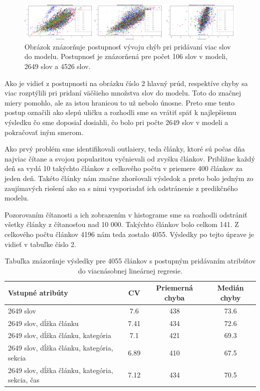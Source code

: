 \documentclass[runningheads,a4paper]{llncs}
\begin{document}
\begin{figure}[h!]
  \centering  
      \includegraphics[width=1.0\textwidth]{proc.png}
  \caption{Obrázok znázorňuje postupnosť vývoju chýb pri pridávaní viac slov do modelu. Postupnosť je znázorňená pre počet 106 slov v modeli, 2649 slov a 4526 slov. }  
\end{figure}   	

Ako je vidieť z postupnosti na obrázku číslo 2 hlavný prúd, respektíve chyby sa viac rozptýlili pri pridaní väčšieho množstva slov do modelu. Toto do značnej miery pomohlo, ale za istou hranicou to už nebolo únosne. Preto sme tento postup označili ako slepú uličku a rozhodli sme sa vrátiť späť k najlepšiemu výsledku čo sme doposiaľ dosiahli, čo bolo pri počte 2649 slov v modeli a pokračovať iným smerom.

Ako prvý problém sme identifikovali outlaiery, teda články, ktoré sú počas dňa najviac čítane a svojou popularitou vyčnievali od zvyšku článkov. Približne každý deň sa vydá 10 takýchto článkov z celkového počtu v priemere 400 článkov za jeden deň. Takéto články nám značne zhoršovali výsledok a preto bolo jedným zo zaujímavých riešení ako sa s nimi vysporiadať ich odstránenie z predikčného modelu.

Pozorovaním čítanosti a ich zobrazením v histograme sme sa rozhodli odstrániť všetky články z čítanosťou nad 10 000. Takýchto článkov bolo celkom 141. Z celkového počtu článkov 4196 nám teda zostalo 4055. Výsledky po tejto úprave je vidieť v tabuľke číslo 2.


\begin{table}
\begin{center}
	\begin{tabular}{|p{5cm}|c|c|c|}
	\hline
	Vstupné atribúty & CV & Priemerná chyba & Medián chyby \\ \hline \hline
	2649 slov & 7.6 & 438 & 73.6 \\ \hline
	2649 slov, dĺžka článku & 7.41 & 434 & 72.6 \\ \hline
	2649 slov, dĺžka článku, kategória & 7.1 & 421 & 69.3 \\ \hline
	2649 slov, dĺžka článku, kategória, sekcia & 6.89 & 410 & 67.5  \\ \hline
	2649 slov, dĺžka článku, kategória, sekcia, čas & 7.12 & 434 & 70.5 \\ \hline
	\end{tabular}
\end{center}
\caption{Tabuľka znázorňuje výsledky pre 4055 článkov s postupným pridávaním atribútov do viacnásobnej lineárnej regresie. }
\end{table}
\end{document}
